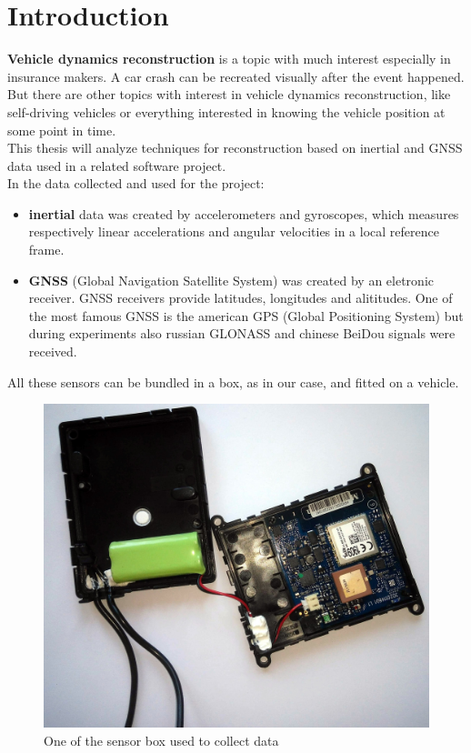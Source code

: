 \chapter{Introduction}
\label{chap:intro}

\textbf{Vehicle dynamics reconstruction} is a topic with much interest especially in insurance makers. A car crash can be recreated visually after the event happened. But there are other topics with interest in vehicle dynamics reconstruction, like self-driving vehicles or everything interested in knowing the vehicle position at some point in time. \\
This thesis will analyze techniques for reconstruction based on inertial and GNSS data used in a related software project. \\
In the data collected and used for the project:
\begin{itemize}
\item \textbf{inertial} data was created by accelerometers and gyroscopes, which measures respectively linear accelerations and angular velocities in a local reference frame. 
\item \textbf{GNSS} (Global Navigation Satellite System) was created by an eletronic receiver. GNSS receivers provide latitudes, longitudes and alititudes. One of the most famous GNSS is the american GPS (Global Positioning System) but during experiments also russian GLONASS and chinese BeiDou signals were received. 
\end{itemize}
All these sensors can be bundled in a box, as in our case, and fitted on a vehicle. \\


\begin{figure}[H]
\includegraphics[width=\linewidth]{box.jpg}
\caption{One of the sensor box used to collect data}
\end{figure}


